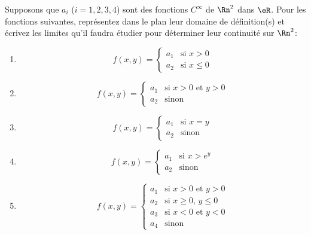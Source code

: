 
\begin{exercice}\label{exoLimSup0001}

	Supposons que $a_i$ ($i=1,2,3,4$) sont des fonctions $C^\infty$ de $\Rn^2$ dans $\eR$. Pour les fonctions suivantes, représentez dans le plan leur domaine de définition(s) et écrivez les limites qu'il faudra étudier pour déterminer leur continuité sur $\Rn^2$:

\begin{multicols}{2}
	\begin{enumerate}
	\item 
	\begin{equation}
		f(x,y)=
			\begin{cases}
		a_1	&	\text{si $x>0$}\\
		a_2	&	 \text{si $x\leq 0$}
	\end{cases}
	\end{equation}

	\item 
	\begin{equation}
		f(x,y)=
			\begin{cases}
		a_1	&	\text{si $x>0$ et $y>0$}\\
		a_2	&	 \text{sinon}
	\end{cases}
	\end{equation}

	\item 
	\begin{equation}
		f(x,y)=
			\begin{cases}
		a_1	&	\text{si $x=y$}\\
		a_2	&	 \text{sinon}
	\end{cases}
	\end{equation}

	\item 
	\begin{equation}
		f(x,y)=
			\begin{cases}
		a_1	&	\text{si $x> e^{y}$}\\
		a_2	&	 \text{sinon}
	\end{cases}
	\end{equation}

	\item 
	\begin{equation}
		f(x,y)=
			\begin{cases}
		a_1	&	\text{si $x>0$ et $y>0$}\\
		a_2	&	 \text{si $x\geq 0$, $y\leq 0$}\\
		a_3	&	 \text{si $x<0$ et $y<0$}\\
		a_4	&	 \text{sinon}
	\end{cases}
	\end{equation}


\end{enumerate}
\end{multicols}
\end{exercice}
